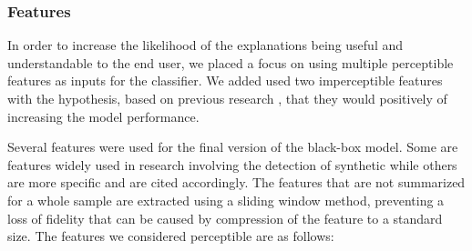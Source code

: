 \documentclass{article}
\begin{document}
			\subsubsection{Features}
			In order to increase the likelihood of the explanations being useful and
			understandable to the end user, we placed a focus on using multiple perceptible
			features as inputs for the classifier. We added used two imperceptible features with
			the hypothesis, based on previous research \cite{barrington_single_2023,
			chaiwongyen_contribution_2022,chaiwongyen_deepfake-speech_2023,li_comparative_2022},
			that they would positively of increasing the model performance.
			\par
			Several features were used for the final version of the black-box model. Some are
			features widely used in research involving the detection of synthetic while others are
			more specific and are cited accordingly. The features that are not summarized for a
			whole sample are extracted using a sliding window method, preventing a loss of
			fidelity that can be caused by compression of the feature to a standard size. The
			features we considered perceptible are as follows:
\end{document}
